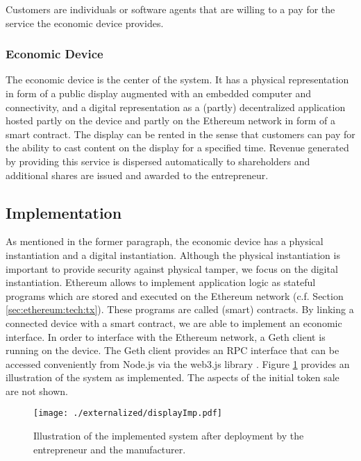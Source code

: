 Customers are individuals or software agents that are willing to a pay for the service the economic device provides.

\subsubsection{Economic Device}

The economic device is the center of the system. It has a physical representation in form of a public display augmented with an embedded computer and connectivity, and a digital representation as a (partly) decentralized application hosted partly on the device and partly on the Ethereum network in form of a smart contract. The display can be rented in the sense that customers can pay for the ability to cast content on the display for a specified time. Revenue generated by providing this service is dispersed automatically to shareholders and additional shares are issued and awarded to the entrepreneur.

\subsection{Implementation}

As mentioned in the former paragraph, the economic device has a physical instantiation and a digital instantiation. Although the physical instantiation is important to provide security against physical tamper, we focus on the digital instantiation. Ethereum allows to implement application logic as stateful programs which are stored and executed on the Ethereum network (c.f. Section \ref{sec:ethereum:tech:tx}). These programs are called (smart) contracts. By linking a connected device with a smart contract, we are able to implement an economic interface. In order to interface with the Ethereum network, a Geth client \parencite{Geth} is running on the device. The Geth client provides an \ac{RPC} interface that can be accessed conveniently from Node.js via the web3.js library \parencite{Web3}. Figure \ref{fig:displayImp} provides an illustration of the system as implemented. The aspects of the initial token sale are not shown. 

\begin{figure}
 \centering
 \texttt{[image: ./externalized/displayImp.pdf]}
 \caption{Illustration of the implemented system after deployment by the entrepreneur and the manufacturer.}
 \label{fig:displayImp}
 \end{figure}


